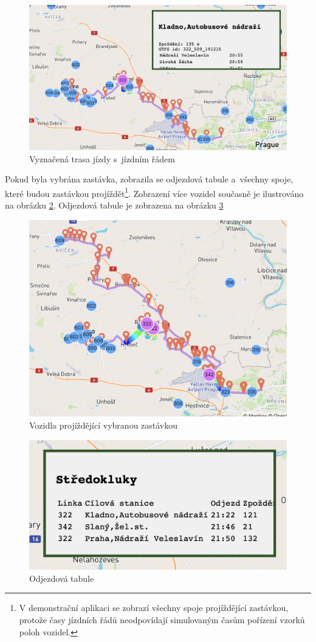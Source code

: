 \begin{figure}
   \centering
 \includegraphics[width=0.7\linewidth]{../img/kladno_aut_322.png}
 \caption{Vyznačená trasa jízdy s~jízdním řádem}
 \label{fig:kladno_aut_322}
\end{figure}


\bigbreak

Pokud byla vybrána zastávka, zobrazila se odjezdová tabule a~všechny spoje, které budou zastávkou projíždět\footnote{V demonstrační aplikaci se zobrazí všechny spoje projíždějící zastávkou, protože časy jízdních řádů neodpovídají simulovaným časům pořízení vzorků poloh vozidel.}. Zobrazení více vozidel současně je ilustrováno na obrázku \ref{fig:more_trips}. Odjezdová tabule je zobrazena na obrázku \ref{fig:stredokluky_table}


\begin{figure}
   \centering
 \includegraphics[width=0.7\linewidth]{../img/more_trips.png}
 \caption{Vozidla projíždějící vybranou zastávkou}
 \label{fig:more_trips}
\end{figure}


\begin{figure}
   \centering
 \includegraphics[width=0.4\linewidth]{../img/stredokluky_table.png}
 \caption{Odjezdová tabule}
 \label{fig:stredokluky_table}
\end{figure}


